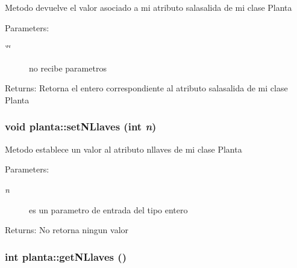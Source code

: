 Metodo devuelve el valor asociado a mi atributo salasalida de mi clase Planta \begin{Desc}
\item[Parameters:]
\begin{description}
\item[{\em \char`\"{}\char`\"{}}]no recibe parametros \end{description}
\end{Desc}
\begin{Desc}
\item[Returns:]Retorna el entero correspondiente al atributo salasalida de mi clase Planta \end{Desc}
\hypertarget{classplanta_4b11a7bc1bd000f01a7af5da1df7a285}{
\subsubsection[setNLlaves]{\setlength{\rightskip}{0pt plus 5cm}void planta::setNLlaves (int {\em n})}}
\label{classplanta_4b11a7bc1bd000f01a7af5da1df7a285}


Metodo establece un valor al atributo nllaves de mi clase Planta \begin{Desc}
\item[Parameters:]
\begin{description}
\item[{\em n}]es un parametro de entrada del tipo entero \end{description}
\end{Desc}
\begin{Desc}
\item[Returns:]No retorna ningun valor \end{Desc}
\hypertarget{classplanta_5087143df250ee8686a3c5387961f01e}{
\subsubsection[getNLlaves]{\setlength{\rightskip}{0pt plus 5cm}int planta::getNLlaves ()}}
\label{classplanta_5087143df250ee8686a3c5387961f01e}


